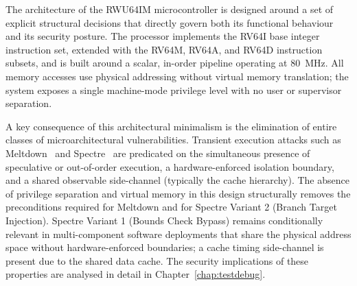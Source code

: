 %
%



The architecture of the RWU64IM microcontroller is designed around a set of explicit
structural decisions that directly govern both its functional behaviour and its security
posture.  The processor implements the RV64I base integer instruction set, extended
with the RV64M, RV64A, and RV64D instruction subsets, and is built around a scalar,
in-order pipeline operating at \SI{80}{\mega\hertz}.  All memory accesses use physical
addressing without virtual memory translation; the system exposes a single machine-mode
privilege level with no user or supervisor separation.

A key consequence of this architectural minimalism is the elimination of entire classes
of microarchitectural vulnerabilities.  Transient execution attacks such as
Meltdown~\cite{lipp2018meltdown} and Spectre~\cite{kocher2019spectre} are predicated
on the simultaneous presence of speculative or out-of-order execution, a hardware-enforced
isolation boundary, and a shared observable side-channel (typically the cache hierarchy).
The absence of privilege separation and virtual memory in this design structurally
removes the preconditions required for Meltdown and for Spectre Variant 2 (Branch
Target Injection).  Spectre Variant 1 (Bounds Check Bypass) remains conditionally
relevant in multi-component software deployments that share the physical address space
without hardware-enforced boundaries; a cache timing side-channel is present due to the
shared data cache.  The security implications of these properties are analysed in
detail in Chapter~\ref{chap:testdebug}.

